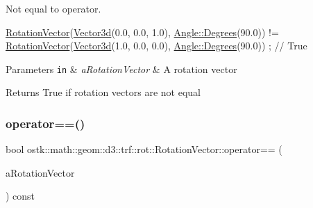 Not equal to operator. 


\begin{DoxyCode}
\hyperlink{classostk_1_1math_1_1geom_1_1d3_1_1trf_1_1rot_1_1_rotation_vector_ad05e6af649dbdd145793773e2ab1cdce}{RotationVector}(\hyperlink{namespaceostk_1_1math_1_1obj_a18744cbf433bce59f6758d9fe3b1dff1}{Vector3d}(0.0, 0.0, 1.0), \hyperlink{classostk_1_1math_1_1geom_1_1_angle_a2cefda601167af07f61f0477776203ca}{Angle::Degrees}(90.0)) != 
      \hyperlink{classostk_1_1math_1_1geom_1_1d3_1_1trf_1_1rot_1_1_rotation_vector_ad05e6af649dbdd145793773e2ab1cdce}{RotationVector}(\hyperlink{namespaceostk_1_1math_1_1obj_a18744cbf433bce59f6758d9fe3b1dff1}{Vector3d}(1.0, 0.0, 0.0), \hyperlink{classostk_1_1math_1_1geom_1_1_angle_a2cefda601167af07f61f0477776203ca}{Angle::Degrees}(90.0)) ; \textcolor{comment}{// True}
\end{DoxyCode}



\begin{DoxyParams}[1]{Parameters}
\mbox{\tt in}  & {\em a\+Rotation\+Vector} & A rotation vector \\
\hline
\end{DoxyParams}
\begin{DoxyReturn}{Returns}
True if rotation vectors are not equal 
\end{DoxyReturn}
\mbox{\label{classostk_1_1math_1_1geom_1_1d3_1_1trf_1_1rot_1_1_rotation_vector_a644c0560138c46f13030ae40dc78b47f}} 
\subsubsection{\texorpdfstring{operator==()}{operator==()}}
{\footnotesize\ttfamily bool ostk\+::math\+::geom\+::d3\+::trf\+::rot\+::\+Rotation\+Vector\+::operator== (\begin{DoxyParamCaption}\item[{const \hyperlink{classostk_1_1math_1_1geom_1_1d3_1_1trf_1_1rot_1_1_rotation_vector}{Rotation\+Vector} \&}]{a\+Rotation\+Vector }\end{DoxyParamCaption}) const}




